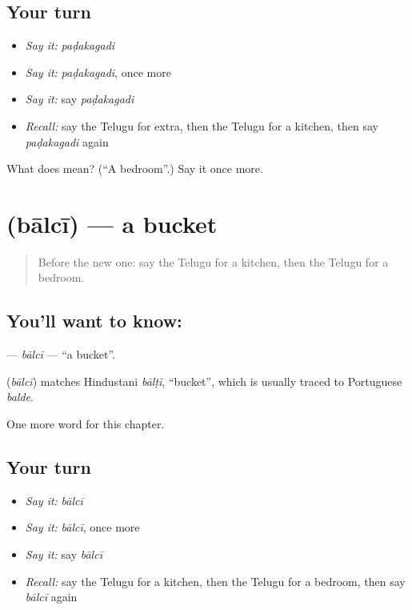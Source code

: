 \subsection*{Your turn}
\begin{itemize}
\raggedright
  \item \emph{Say it:} \emph{paḍakagadi}
  \item \emph{Say it:} \emph{paḍakagadi}, once more
  \item \emph{Say it:} say \emph{paḍakagadi}
  \item \emph{Recall:} say the Telugu for extra, then the Telugu for a kitchen, then say \emph{paḍakagadi} again
\end{itemize}

\begin{tcolorbox}[breakable,colback=teal!4,colframe=teal!35!black,title={Before you move on}]
What does  mean? (\textquotedblleft{}A bedroom\textquotedblright{}.) Say it once more.
\end{tcolorbox}
\section[\texorpdfstring{\te{బాల్చీ} (bālcī)}{బాల్చీ (bālcī)}]{ (bālcī) — a bucket}

\label{lesson:TE-C183-balci}



\begin{quote}
Before the new one: say the Telugu for a kitchen, then the Telugu for a bedroom.
\end{quote}

\subsection*{You'll want to know: }
\textbf{} — \emph{bālcī} — \textquotedblleft{}a bucket\textquotedblright{}.

\begin{cousinweb}
\textbf{} (\emph{bālcī}) matches Hindustani \emph{bālṭī}, \textquotedblleft{}bucket\textquotedblright{}, which is usually traced to Portuguese \emph{balde}.
\end{cousinweb}

\begin{grammarlens}[title={What you've built}]
One more word for this chapter.
\end{grammarlens}

\subsection*{Your turn}
\begin{itemize}
\raggedright
  \item \emph{Say it:} \emph{bālcī}
  \item \emph{Say it:} \emph{bālcī}, once more
  \item \emph{Say it:} say \emph{bālcī}
  \item \emph{Recall:} say the Telugu for a kitchen, then the Telugu for a bedroom, then say \emph{bālcī} again
\end{itemize}

